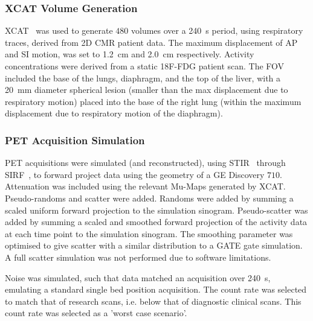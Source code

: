             \subsubsection{XCAT Volume Generation} \label{sec:xcat_volume_generation}
                \gls{XCAT}~\parencite{Segars2010} was used to generate $480$ volumes over a \SI{240}{\second} period, using respiratory traces, derived from \gls{2D} \gls{CMR} patient data. The maximum displacement of \gls{AP} and \gls{SI} motion, was set to \SI{1.2}{\centi\metre} and \SI{2.0}{\centi\metre} respectively. Activity concentrations were derived from a static \gls{18F-FDG} patient scan. The \gls{FOV} included the base of the lungs, diaphragm, and the top of the liver, with a \SI{20}{\milli\metre} diameter spherical lesion (smaller than the max displacement due to respiratory motion) placed into the base of the right lung (within the maximum displacement due to respiratory motion of the diaphragm).
            
            \subsubsection{PET Acquisition Simulation} \label{sec:pet_ct_motion_correction_exploiting_motion_models_fit_on_coarsely_gated_data_applied_to_finely_gated_data_methods_pet_acquisition_simulation}
                \gls{PET} acquisitions were simulated (and reconstructed), using \gls{STIR}~\parencite{Thielemans2012, Nikos2019} through \gls{SIRF}~\parencite{Ovtchinnikov2017}, to forward project data using the geometry of a \gls{GE} Discovery $710$. Attenuation was included using the relevant \glspl{Mu-Map} generated by \gls{XCAT}. Pseudo-randoms and scatter were added. Randoms were added by summing a scaled uniform forward projection to the simulation sinogram. Pseudo-scatter was added by summing a scaled and smoothed forward projection of the activity data at each time point to the simulation sinogram. The smoothing parameter was optimised to give scatter with a similar distribution to a GATE gate simulation. A full scatter simulation was not performed due to software limitations.
                
                Noise was simulated, such that data matched an acquisition over \SI{240}{\second}, emulating a standard single bed position acquisition. The count rate was selected to match that of research scans, i.e. below that of diagnostic clinical scans. This count rate was selected as a 'worst case scenario'.
                
